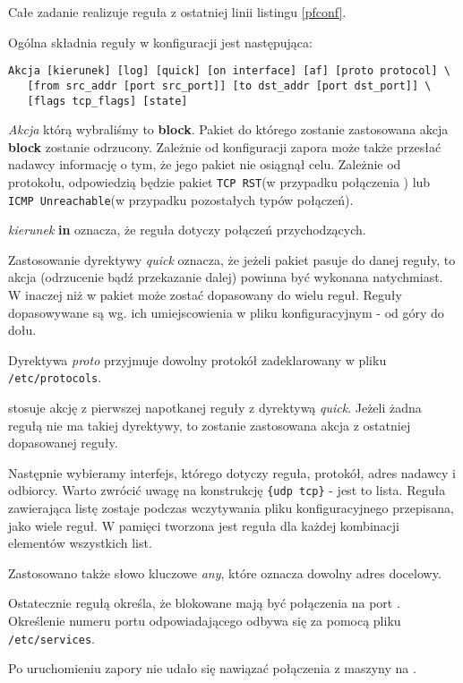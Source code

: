 Całe zadanie realizuje reguła z ostatniej linii listingu \ref{pfconf}.

Ogólna składnia reguły w konfiguracji \pf{} jest następująca:

\begin{lstlisting}
Akcja [kierunek] [log] [quick] [on interface] [af] [proto protocol] \
   [from src_addr [port src_port]] [to dst_addr [port dst_port]] \
   [flags tcp_flags] [state]
\end{lstlisting}

\emph{Akcja} którą wybraliśmy to \textbf{block}.
Pakiet do którego zostanie zastosowana akcja \textbf{block} zostanie odrzucony.
Zależnie od konfiguracji zapora może także przesłać nadawcy informację o tym, że jego pakiet nie osiągnął celu.
Zależnie od protokołu, odpowiedzią będzie pakiet \texttt{TCP RST}(w przypadku połączenia \tcp{}) lub \texttt{ICMP Unreachable}(w przypadku pozostałych typów połączeń).

\emph{kierunek} \textbf{in} oznacza, że reguła dotyczy połączeń przychodzących.

Zastosowanie dyrektywy \emph{quick} oznacza, że jeżeli pakiet pasuje do danej reguły, to akcja (odrzucenie bądź przekazanie dalej) powinna być wykonana natychmiast.
W \pf{} inaczej niż w \ipfw{} pakiet może zostać dopasowany do wielu reguł.
Reguły dopasowywane są wg. ich umiejscowienia w pliku konfiguracyjnym - od góry do dołu.

Dyrektywa \emph{proto} przyjmuje dowolny protokół zadeklarowany w pliku \texttt{/etc/protocols}.

\pf{} stosuje akcję z pierwszej napotkanej reguły z dyrektywą \emph{quick}.
Jeżeli żadna regułą nie ma takiej dyrektywy, to zostanie zastosowana akcja z ostatniej dopasowanej reguły.

Następnie wybieramy interfejs, którego dotyczy reguła, protokół, adres nadawcy i odbiorcy.
Warto zwrócić uwagę na konstrukcję \texttt{\{udp tcp\}} - jest to lista.
Reguła zawierająca listę zostaje podczas wczytywania pliku konfiguracyjnego przepisana, jako wiele reguł.
W pamięci tworzona jest reguła dla każdej kombinacji elementów wszystkich list.

Zastosowano także słowo kluczowe \emph{any}, które oznacza dowolny adres docelowy.

Ostatecznie regułą określa, że blokowane mają być połączenia na port \ssh{}.
Określenie numeru portu odpowiadającego \ssh{} odbywa się za pomocą pliku \texttt{/etc/services}.

Po uruchomieniu zapory nie udało się nawiązać połączenia \ssh{} z maszyny \volt{} na \emoip{}.

